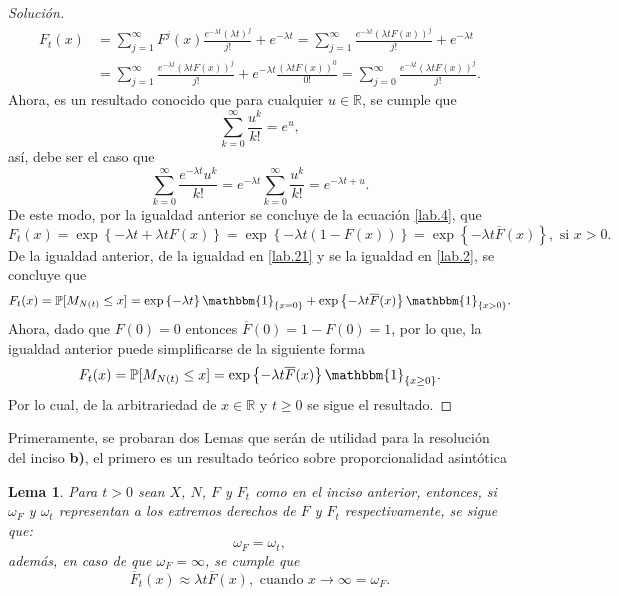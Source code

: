 \documentclass[10.5pt,notitlepage]{article}
\newenvironment{solucion}
  {\begin{proof}[Solución]}
  {\end{proof}}
\newcommand{\PP}{\mathbb{P}}
\newcommand{\RR}{\mathbb{R}}
\newcommand{\kis}[1]{\left\{ #1 \right\}}
\theoremstyle{plain}
\newtheorem{lem}[thm]{Lema} %
\begin{document}
\begin{solucion}
\begin{align}
       F_{t}(x) &= \sum_{j = 1}^{\infty}F^{j}(x)\frac{e^{-\lambda t} (\lambda t)^{j}}{j!} + e^{-\lambda t}= \sum_{j = 1}^{\infty}\frac{e^{-\lambda t} (\lambda t F(x))^{j}}{j!} + e^{-\lambda t}\nonumber\\
                &= \sum_{j = 1}^{\infty}\frac{e^{-\lambda t} (\lambda t F(x))^{j}}{j!} + e^{-\lambda t} \frac{(\lambda t F(x))^{0}}{0!}= \sum_{j = 0}^{\infty}\frac{e^{-\lambda t} (\lambda t F(x))^{j}}{j!}.\label{lab.4}
\end{align}
Ahora, es un resultado conocido que para cualquier \(u \in \RR\), se cumple que 
\[
\sum_{k = 0}^{\infty}\frac{u^{k}}{k!} = e^{u},
\]
así, debe ser el caso que 
\[
\sum_{k = 0}^{\infty}\frac{e^{-\lambda t}u^{k}}{k!} = e^{-\lambda t}\sum_{k = 0}^{\infty}\frac{u^{k}}{k!} = e^{- \lambda t + u}.
\]
De este modo, por la igualdad anterior se concluye de la ecuación \eqref{lab.4}, que 
\[
  F_{t}(x) = \exp\kis{-\lambda t + \lambda t F(x)} = \exp\kis{-\lambda t( 1- F(x))} =  \exp\kis{-\lambda t\overline{F}(x)}, \text{ si } x > 0.
\]
De la igualdad anterior, de la igualdad en \eqref{lab.21} y se la igualdad en \eqref{lab.2}, se concluye que 
\begin{equation*}
    F_{t}(x) = \PP[M_{N(t)} \leq x] =  \exp\kis{-\lambda t}\mathbbm{1}_{\kis{x = 0}} + \exp\kis{-\lambda t\overline{F}(x)}\mathbbm{1}_{\kis{x > 0}}.
\end{equation*}
Ahora, dado que \(F(0) = 0\) entonces \(\overline{F}(0)=1- F(0) = 1\), por lo que, la igualdad anterior puede simplificarse de la siguiente forma
\begin{equation}\label{lab.6}
    F_{t}(x) = \PP[M_{N(t)} \leq x] =  \exp\kis{-\lambda t\overline{F}(x)}\mathbbm{1}_{\kis{x \geq 0}}.
\end{equation}
Por lo cual, de la arbitrariedad de \(x \in \RR\) y \(t \geq 0\) se sigue el resultado.
\end{solucion}
\newpage 
Primeramente, se probaran dos Lemas que serán de utilidad para la resolución del inciso \textbf{b)}, el primero es un resultado teórico sobre proporcionalidad asintótica 
\begin{lem}\label{lem.1}
Para \(t > 0\) sean \(X\), \(N\), \(F\) y \(F_{t}\) como en el inciso anterior, entonces, si \(\omega_F\) y \(\omega_{t}\) representan a los extremos derechos de \(F\) y \(F_t\) respectivamente, se sigue que: 
\[
\omega_{F} = \omega_{t}, 
\]
además, en caso de que \(\omega_F = \infty\), se cumple que
\[
\overline{F}_{t}(x) \approx \lambda t \overline{F}(x), \text{ cuando } x \to \infty = \omega_{F}. 
\]
\end{lem}
\end{document}
